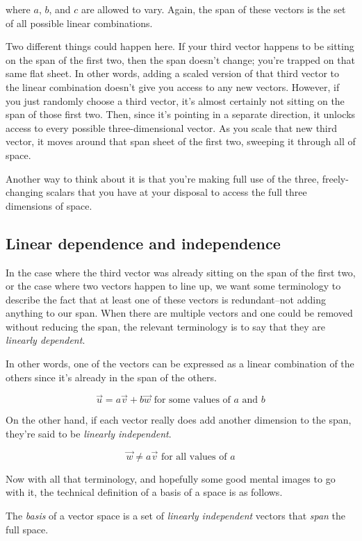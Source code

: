 where $a$, $b$, and $c$ are allowed to vary. Again, the span of these vectors is
the set of all possible linear combinations.

Two different things could happen here. If your third vector happens to be
sitting on the span of the first two, then the span doesn't change; you're
trapped on that same flat sheet. In other words, adding a scaled version of that
third vector to the linear combination doesn't give you access to any new
vectors. However, if you just randomly choose a third vector, it's almost
certainly not sitting on the span of those first two. Then, since it's pointing
in a separate direction, it unlocks access to every possible three-dimensional
vector. As you scale that new third vector, it moves around that span sheet of
the first two, sweeping it through all of space.

Another way to think about it is that you're making full use of the three,
freely-changing scalars that you have at your disposal to access the full three
dimensions of space.

\subsection{Linear dependence and independence}

In the case where the third vector was already sitting on the span of the first
two, or the case where two vectors happen to line up, we want some terminology
to describe the fact that at least one of these vectors is redundant--not adding
anything to our span. When there are multiple vectors and one could be removed
without reducing the span, the relevant terminology is to say that they are
\textit{linearly dependent}.

In other words, one of the vectors can be expressed as a linear combination of
the others since it's already in the span of the others.

\begin{equation*}
  \vec{u} = a\vec{v} + b\vec{w} \text{ for some values of $a$ and $b$}
\end{equation*}

On the other hand, if each vector really does add another dimension to the span,
they're said to be \textit{linearly independent}.

\begin{equation*}
  \vec{w} \neq a\vec{v} \text{ for all values of $a$}
\end{equation*}

Now with all that terminology, and hopefully some good mental images to go with
it, the technical definition of a basis of a space is as follows.

\begin{definition}
  The \textit{basis} of a vector space is a set of \textit{linearly independent}
  vectors that \textit{span} the full space.
\end{definition}
